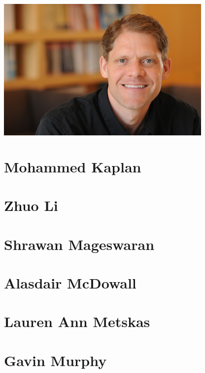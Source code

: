 \documentclass[]{tufte-book}
\begin{document}
\includegraphics{img/bios/grant_jensen}

\hypertarget{mohammed_kaplan}{\section*{Mohammed
Kaplan}\label{mohammed_kaplan}}

\hypertarget{zhuo_li}{\section*{Zhuo Li}\label{zhuo_li}}

\hypertarget{shrawan_mageswaran}{\section*{Shrawan
Mageswaran}\label{shrawan_mageswaran}}

\hypertarget{alasdair_mcdowall}{\section*{Alasdair
McDowall}\label{alasdair_mcdowall}}

\hypertarget{lauren_ann_metskas}{\section*{Lauren Ann
Metskas}\label{lauren_ann_metskas}}

\hypertarget{gavin_murphy}{\section*{Gavin Murphy}\label{gavin_murphy}}
\end{document}
